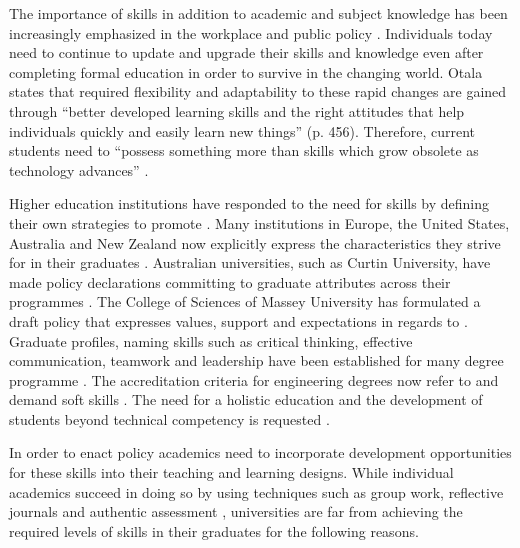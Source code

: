 
The importance of \LLLs skills in addition to academic and subject knowledge has
been increasingly emphasized in the workplace and public policy
\citep{Morgan-Klein2007,Sutherland2006}. Individuals today need to continue to
update and upgrade their skills and knowledge even after completing formal
education in order to survive in the changing world. Otala
\citeyearpar{Otala1997} states that required flexibility and adaptability to
these rapid changes are gained through ``better developed learning skills and
the right attitudes that help individuals quickly and easily learn new things''
(p. 456). Therefore, current students need to ``possess something more than
skills which grow obsolete as technology advances'' \cite[p.~195]{Field2003}. 

Higher education institutions have responded to the need for \LLLs skills by
defining their own strategies to promote \LLLsn. Many institutions in Europe,
the United States, Australia and New Zealand now explicitly express the \LLLs
characteristics they strive for in their graduates \citep{Scanlon2006}.
Australian universities, such as Curtin University, have made policy
declarations committing to graduate attributes across their programmes
\citep{CurtinUniversity2006}. The College of Sciences of Massey University has
formulated a draft \LLLs policy \citep{MasseyUniversity2008} that expresses
values, support and expectations in regards to \LLLsn. Graduate profiles, naming
\LLLs skills such as critical thinking, effective communication, teamwork and
leadership have been established for many degree programme
\citep{Davies2003,McAlister2003}. The accreditation criteria for engineering
degrees now refer to and demand soft skills \citep{Aller2005,Muffo2001}. The
need for a holistic education and the development of students beyond technical
competency is requested \citep{Brakke2002,Davies2003,Dowling2006,Fallows2003,Grabowski2004,Hernon2006}.

In order to enact policy academics need to incorporate development opportunities
for these skills into their teaching and learning designs. While individual
academics succeed in doing so by using techniques such as group work, reflective
journals and authentic assessment \citep{Clarke2003,Lombardi2008}, universities
are far from achieving the required levels of \LLLs skills in their graduates
for the following reasons.

